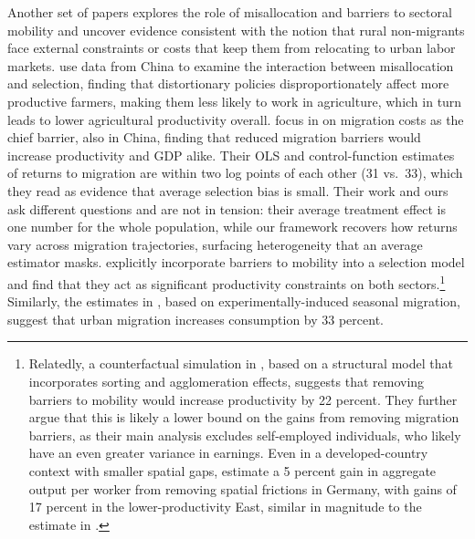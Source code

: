 \documentclass[12pt]{article}
\begin{document}
Another set of papers explores the role of misallocation and barriers to sectoral mobility and uncover evidence consistent with the notion that rural non-migrants face external constraints or costs that keep them from relocating to urban labor markets.
\cite{adamopoulosMisallocationSelectionProductivity2022} use data from China to examine the interaction between misallocation and selection, finding that distortionary policies disproportionately affect more productive farmers, making them less likely to work in agriculture, which in turn leads to lower agricultural productivity overall.
\cite{gaiRuralPensionsLabor2025} focus in on migration costs as the chief barrier, also in China, finding that reduced migration barriers would increase productivity and GDP alike.
Their OLS and control-function estimates of returns to migration are within two log points of each other (31 vs.\ 33), which they read as evidence that average selection bias is small.
Their work and ours ask different questions and are not in tension: their average treatment effect is one number for the whole population, while our framework recovers how returns vary across migration trajectories, surfacing heterogeneity that an average estimator masks.
\cite{pulidoBarriersMobilitySorting2021} explicitly incorporate barriers to mobility into a selection model and find that they act as significant productivity constraints on both sectors.\footnote{Relatedly, a counterfactual simulation in \cite{bryanAggregateProductivityEffects2019}, based on a structural model that incorporates sorting and agglomeration effects, suggests that removing barriers to mobility would increase productivity by 22 percent. They further argue that this is likely a lower bound on the gains from removing migration barriers, as their main analysis excludes self-employed individuals, who likely have an even greater variance in earnings. Even in a developed-country context with smaller spatial gaps, \cite{heiseLaborMisallocation2023} estimate a 5 percent gain in aggregate output per worker from removing spatial frictions in Germany, with gains of 17 percent in the lower-productivity East, similar in magnitude to the estimate in \citet{bryanAggregateProductivityEffects2019}.}
Similarly, the estimates in \cite{bryanUnderinvestmentProfitableTechnology2014}, based on experimentally-induced seasonal migration, suggest that urban migration increases consumption by 33 percent. 
\end{document}
